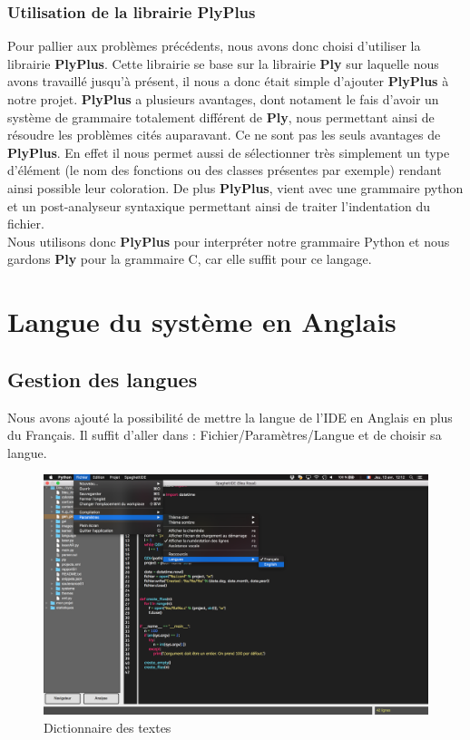 \documentclass[a4paper,12pt]{article}
\begin{document}
		\subsubsection{Utilisation de la librairie PlyPlus}

			Pour pallier aux problèmes précédents, nous avons donc choisi d'utiliser la librairie \textbf{PlyPlus}. Cette librairie se base sur la librairie \textbf{Ply} sur laquelle nous avons travaillé jusqu'à présent, il nous a donc était simple d'ajouter \textbf{PlyPlus} à notre projet. \textbf{PlyPlus} a plusieurs avantages, dont notament le fais d'avoir un système de grammaire totalement différent de \textbf{Ply}, nous permettant ainsi de résoudre les problèmes cités auparavant. Ce ne sont pas les seuls avantages de \textbf{PlyPlus}. En effet il nous permet aussi de sélectionner très simplement un type d'élément (le nom des fonctions ou des classes présentes par exemple) rendant ainsi possible leur coloration. De plus \textbf{PlyPlus}, vient avec une grammaire python et un post-analyseur syntaxique permettant ainsi de traiter l'indentation du fichier. \\
			
			Nous utilisons donc \textbf{PlyPlus} pour interpréter notre grammaire Python et nous gardons \textbf{Ply} pour la grammaire C, car elle suffit pour ce langage.

\newpage

\section{Langue du système en Anglais}

	\subsection{Gestion des langues}

	Nous avons ajouté la possibilité de mettre la langue de l'IDE en Anglais en plus du Français. Il suffit d'aller dans : Fichier/Paramètres/Langue et de choisir sa langue.\\
	
	\begin{figure}[h!]
			\begin{center}
					\includegraphics[scale=0.3]{images/langues}
					\caption{Dictionnaire des textes}
			\end{center}
	\end{figure}
	
\end{document}
